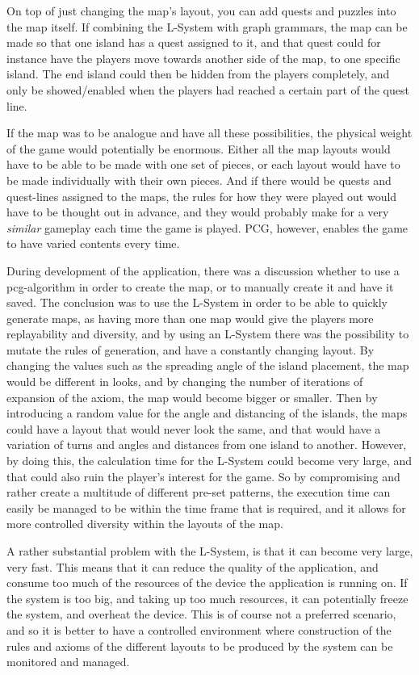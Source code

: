 On top of just changing the map's layout, you can add quests and puzzles into the map itself. If combining the L-System with graph grammars, the map can be made so that one island has a quest assigned to it, and that quest could for instance have the players move towards another side of the map, to one specific island. 
The end island could then be hidden from the players completely, and only be showed/enabled when the players had reached a certain part of the quest line.

If the map was to be analogue and have all these possibilities, the physical weight of the game would potentially be enormous. 
Either all the map layouts would have to be able to be made with one set of pieces, or each layout would have to be made individually with their own pieces. And if there would be quests and quest-lines assigned to the maps, the rules for how they were played out would have to be thought out in advance, and they would probably make for a very \textit{similar} gameplay each time the game is played. PCG, however, enables the game to have varied contents every time.

During development of the application, there was a discussion whether to use a pcg-algorithm in order to create the map, or to manually create it and have it saved. The conclusion was to use the L-System in order to be able to quickly generate maps, as having more than one map would give the players more replayability and diversity, and by using an L-System there was the possibility to mutate the rules of generation, and have a constantly changing layout. By changing the values such as the spreading angle of the island placement, the map would be different in looks, and by changing the number of iterations of expansion of the axiom, the map would become bigger or smaller. Then by introducing a random value for the angle and distancing of the islands, the maps could have a layout that would never look the same, and that would have a variation of turns and angles and distances from one island to another. However, by doing this, the calculation time for the L-System could become very large, and that could also ruin the player's interest for the game. So by compromising and rather create a multitude of different pre-set patterns, the execution time can easily be managed to be within the time frame that is required, and it allows for more controlled diversity within the layouts of the map.

A rather substantial problem with the L-System, is that it can become very large, very fast. This means that it can reduce the quality of the application, and consume too much of the resources of the device the application is running on. 
If the system is too big, and taking up too much resources, it can potentially freeze the system, and overheat the device. 
This is of course not a preferred scenario, and so it is better to have a controlled environment where construction of the rules and axioms of the different layouts to be produced by the system can be monitored and managed.

